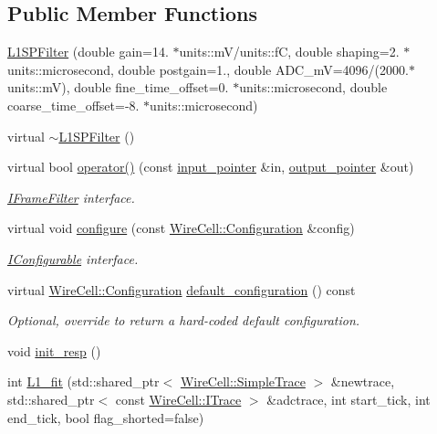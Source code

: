 \subsection*{Public Member Functions}
\begin{DoxyCompactItemize}
\item 
\hyperlink{class_wire_cell_1_1_sig_proc_1_1_l1_s_p_filter_a7d0f598eb9e9bbb7acbcdbce742ccdb2}{L1\+S\+P\+Filter} (double gain=14. $\ast$units\+::mV/units\+::fC, double shaping=2. $\ast$units\+::microsecond, double postgain=1., double A\+D\+C\+\_\+mV=4096/(2000.$\ast$units\+::mV), double fine\+\_\+time\+\_\+offset=0. $\ast$units\+::microsecond, double coarse\+\_\+time\+\_\+offset=-\/8. $\ast$units\+::microsecond)
\item 
virtual \hyperlink{class_wire_cell_1_1_sig_proc_1_1_l1_s_p_filter_a9e2ef6ef5928d6c386005d78de85d020}{$\sim$\+L1\+S\+P\+Filter} ()
\item 
virtual bool \hyperlink{class_wire_cell_1_1_sig_proc_1_1_l1_s_p_filter_ac58397721b0a7b485d46ac63522ebe87}{operator()} (const \hyperlink{class_wire_cell_1_1_i_function_node_a55c0946156df9b712b8ad1a0b59b2db6}{input\+\_\+pointer} \&in, \hyperlink{class_wire_cell_1_1_i_function_node_afc02f1ec60d31aacddf64963f9ca650b}{output\+\_\+pointer} \&out)
\begin{DoxyCompactList}\small\item\em \hyperlink{class_wire_cell_1_1_i_frame_filter}{I\+Frame\+Filter} interface. \end{DoxyCompactList}\item 
virtual void \hyperlink{class_wire_cell_1_1_sig_proc_1_1_l1_s_p_filter_a2a7fa041a4d3087b2070f676fc7e4fa2}{configure} (const \hyperlink{namespace_wire_cell_a9f705541fc1d46c608b3d32c182333ee}{Wire\+Cell\+::\+Configuration} \&config)
\begin{DoxyCompactList}\small\item\em \hyperlink{class_wire_cell_1_1_i_configurable}{I\+Configurable} interface. \end{DoxyCompactList}\item 
virtual \hyperlink{namespace_wire_cell_a9f705541fc1d46c608b3d32c182333ee}{Wire\+Cell\+::\+Configuration} \hyperlink{class_wire_cell_1_1_sig_proc_1_1_l1_s_p_filter_aa37fc09d196529f29eb2477fe1c0317a}{default\+\_\+configuration} () const
\begin{DoxyCompactList}\small\item\em Optional, override to return a hard-\/coded default configuration. \end{DoxyCompactList}\item 
void \hyperlink{class_wire_cell_1_1_sig_proc_1_1_l1_s_p_filter_ad93828b53fee0709cd9649526b5884e7}{init\+\_\+resp} ()
\item 
int \hyperlink{class_wire_cell_1_1_sig_proc_1_1_l1_s_p_filter_a9720ba99e84d3cb4df578eb7ee0e436d}{L1\+\_\+fit} (std\+::shared\+\_\+ptr$<$ \hyperlink{class_wire_cell_1_1_simple_trace}{Wire\+Cell\+::\+Simple\+Trace} $>$ \&newtrace, std\+::shared\+\_\+ptr$<$ const \hyperlink{class_wire_cell_1_1_i_trace}{Wire\+Cell\+::\+I\+Trace} $>$ \&adctrace, int start\+\_\+tick, int end\+\_\+tick, bool flag\+\_\+shorted=false)
\end{DoxyCompactItemize}
